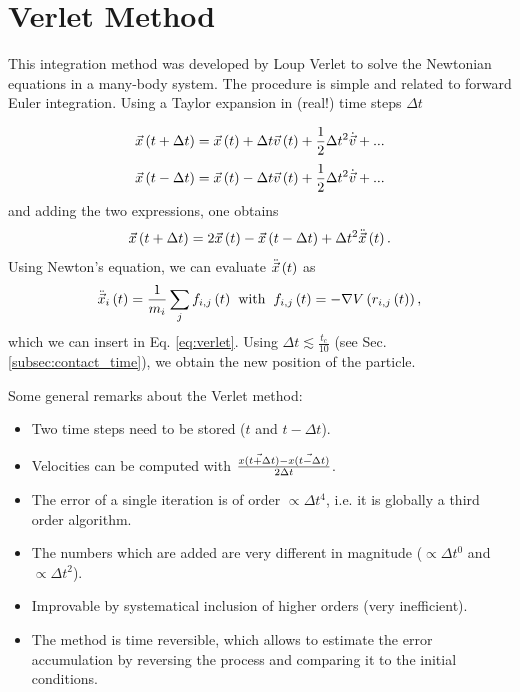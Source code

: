 
\section{Verlet Method}

This integration method was developed by Loup Verlet \citep{verlet} to solve the Newtonian equations in a many-body system. The procedure is simple and related to forward Euler integration. Using a Taylor expansion in (real!) time steps $\Delta t$ 

$$
\vec{x}\left(t+\Delta t\right) = \vec{x}\left(t\right) + \Delta t \vec{v}\left(t\right) + \frac{1}{2}\Delta t^2 \dot{\vec{v}}+ ...
$$
$$
\vec{x}\left(t-\Delta t\right) = \vec{x}\left(t\right) - \Delta t \vec{v}\left(t\right) + \frac{1}{2}\Delta t^2 \dot{\vec{v}}+ ...
$$
and adding the two expressions, one obtains
\begin{equation}
\vec{x}\left(t+ \Delta t\right) = 2 \vec{x}\left(t\right)- \vec{x}\left(t-\Delta t\right) +\Delta t^2 \ddot{\vec{x}}\left(t\right).
\label{eq:verlet}
\end{equation}
Using Newton's equation, we can evaluate $\ddot{\vec{x}}\left(t\right)$ as
$$
\ddot{\vec{x}}_i\left(t\right) = \frac{1}{m_i} \sum_j{f_{i,j}\left(t\right)}
\hspace{0.2cm} \text{with} \hspace{0.2cm} 
f_{i,j}\left(t\right) = - \nabla V\left(r_{i,j} \left(t\right)\right),
$$
which we can insert in Eq. \eqref{eq:verlet}. Using $\Delta t \lesssim \frac{t_c}{10}$ (see Sec. \ref{subsec:contact_time}), we obtain the new position of the particle. 

Some general remarks about the Verlet method:
\begin{itemize}
\item Two time steps need to be stored ($t$ and $t-\Delta t$).
\item Velocities can be computed with $\frac{\vec{x\left(t+\Delta t\right)} -\vec{x\left(t-\Delta t\right)}}{2\Delta t}$.
\item The error of a single iteration is of order $\propto \Delta t^4$, i.e. it is globally a third order algorithm.
\item The numbers which are added are very different in magnitude ($\propto \Delta t^0$ and $\propto\Delta t^2$).
\item Improvable by systematical inclusion of higher orders (very inefficient).
\item The method is time reversible, which allows to estimate the error accumulation by reversing the process and comparing it to the initial conditions.
\end{itemize}



